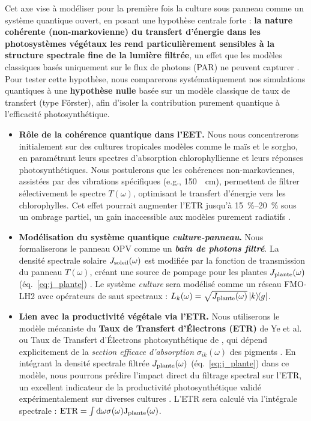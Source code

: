 \documentclass[12pt, a4paper]{article}
\begin{document}
Cet axe vise à modéliser pour la première fois la culture sous panneau comme un système quantique ouvert, en posant une hypothèse centrale forte : \textbf{la nature cohérente (non-markovienne) du transfert d'énergie dans les photosystèmes végétaux les rend particulièrement sensibles à la structure spectrale fine de la lumière filtrée}, un effet que les modèles classiques basés uniquement sur le flux de photons (PAR) ne peuvent capturer \cite{Valle2017}. Pour tester cette hypothèse, nous comparerons systématiquement nos simulations quantiques à une \textbf{hypothèse nulle} basée sur un modèle classique de taux de transfert (type Förster), afin d'isoler la contribution purement quantique à l'efficacité photosynthétique.
\begin{itemize}
    \item \textbf{Rôle de la cohérence quantique dans l'EET.} Nous nous concentrerons initialement sur des cultures tropicales modèles comme le maïs et le sorgho, en paramétrant leurs spectres d'absorption chlorophyllienne et leurs réponses photosynthétiques. Nous postulerons que les cohérences non-markoviennes, assistées par des vibrations spécifiques (e.g., \SI{150}{\per\centi\meter}), permettent de filtrer sélectivement le spectre $T(\omega)$, optimisant le transfert d'énergie vers les chlorophylles. Cet effet pourrait augmenter l'ETR jusqu'à \SIrange{15}{20}{\percent} sous un ombrage partiel, un gain inaccessible aux modèles purement radiatifs \cite{Adeyemi2025}.
    
    \item \textbf{Modélisation du système quantique \textit{culture-panneau}.} Nous formaliserons le panneau OPV comme un \textbf{\textit{bain de photons filtré}}. La densité spectrale solaire $J_{\rm soleil}(\omega)$ est modifiée par la fonction de transmission du panneau $T(\omega)$, créant une source de pompage pour les plantes $J_{\rm plante}(\omega)$ (éq.~\eqref{eq:j_plante}) \cite{Gong2024, Shi2025a}. Le système \textit{culture} sera modélisé comme un réseau FMO-LH2 avec opérateurs de saut spectraux : $L_k(\omega) = \sqrt{J_{\rm plante}(\omega)} \op{k}{g}$.

    
    \item \textbf{Lien avec la productivité végétale via l'ETR.} Nous utiliserons le modèle mécaniste du \textbf{Taux de Transfert d'Électrons (ETR)} de Ye et al. ou Taux de Transfert d'Électrons photosynthétique de \cite{ye2012}, qui dépend explicitement de la \textit{section efficace d'absorption} $\sigma_{ik}(\omega)$ des pigments \cite{ye2012}. En intégrant la densité spectrale filtrée $J_{\rm plante}(\omega)$ (éq.~\eqref{eq:j_plante}) dans ce modèle, nous pourrons prédire l'impact direct du filtrage spectral sur l'ETR, un excellent indicateur de la productivité photosynthétique validé expérimentalement sur diverses cultures \cite{ye2012, Scarano2024}. L'ETR sera calculé via l'intégrale spectrale : $\rm ETR = \int \dd\omega \sigma(\omega) J_{\rm plante}(\omega)$.
    

\end{itemize}
\end{document}
